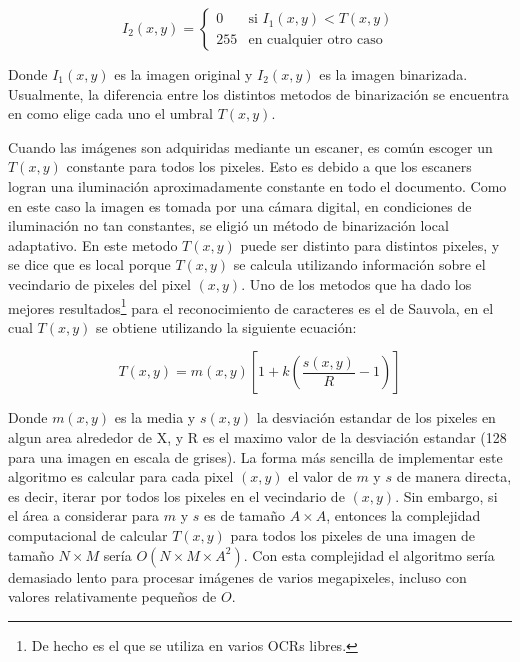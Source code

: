 \documentclass[a4paper, 11pt, oneside]{report}
\begin{document}
\begin{equation}\label{binEq}
	I_2(x,y) = \left\{ \begin{array}{ll}
		0   & \mbox{si $I_1(x,y) < T(x,y)$} \\
		255 & \mbox{en cualquier otro caso}
	\end{array} \right. 
\end{equation}

Donde $I_1(x,y)$ es la imagen original y $I_2(x,y)$ es la imagen binarizada. Usualmente, la diferencia entre los distintos metodos de binarización se encuentra en como elige cada uno el umbral $T(x,y)$.

Cuando las imágenes son adquiridas mediante un escaner, es común escoger un $T(x,y)$ constante para todos los pixeles. Esto es debido a que los escaners logran una iluminación aproximadamente constante en todo el documento. Como en este caso la imagen es tomada por una cámara digital, en condiciones de iluminación no tan constantes, se eligió un método de binarización local adaptativo. En este metodo $T(x,y)$ puede ser distinto para distintos pixeles, y se dice que es local porque $T(x,y)$ se calcula utilizando información sobre el vecindario de pixeles del pixel $(x,y)$. Uno de los metodos que ha dado los mejores resultados\footnote{De hecho es el que se utiliza en varios OCRs libres.} para el reconocimiento de caracteres es el de Sauvola, en el cual $T(x,y)$ se obtiene utilizando la siguiente ecuación:

\begin{equation}
	T(x,y)=m(x,y)\left[ 1 + k(\frac{s(x,y)}{R}-1) \right]
\end{equation}

Donde $m(x,y)$ es la media y $s(x,y)$ la desviación estandar de los pixeles en algun area alrededor de X, y R es el maximo valor de la desviación estandar (128 para una imagen en escala de grises). La forma más sencilla de implementar este algoritmo es calcular para cada pixel $(x,y)$ el valor de $m$ y $s$ de manera directa, es decir, iterar por todos los pixeles en el vecindario de $(x,y)$. Sin embargo, si el área a considerar para $m$ y $s$ es de tamaño $A \times A$, entonces la complejidad computacional de calcular $T(x,y)$ para todos los pixeles de una imagen de tamaño $N \times M$ sería $O(N \times M \times A^{2})$. Con esta complejidad el algoritmo sería demasiado lento para procesar imágenes de varios megapixeles, incluso con valores relativamente pequeños de $O$.

\end{document}
